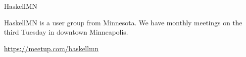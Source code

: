 \begin{hcarentry}{HaskellMN}
\makeheader

HaskellMN is a user group from Minnesota. We have monthly meetings on
the third Tuesday in downtown Minneapolis.

\FurtherReading
\url{https://meetup.com/haskellmn}
\end{hcarentry}
